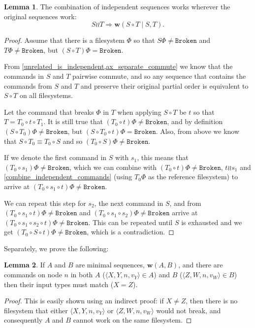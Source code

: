 \documentclass[12pt]{article}
\newcommand{\fsbroken}{\mathtt{Broken}} %
\newcommand{\FS}{\Phi} %
\newcommand{\valvy}{v_Y} %
\newcommand{\valvw}{v_W}
\newcommand{\caaaa}[4]{\langle{#1,#2,#3,#4}\rangle}
\newcommand{\cxynv}{\caaaa{X}{Y}{n}{\valvy}}
\newcommand{\czwnv}{\caaaa{Z}{W}{n}{\valvw}}
\newcommand{\cc}{\circ} %
\newcommand{\indep}{\mathrel{\wr\wr}} %
\newcommand{\workssign}{\mathbf{w}}
\newcommand{\works}[1]{\workssign({#1})}
\newcommand{\worksc}[2]{\workssign({#1}\mathrel{|}{#2})}
\theoremstyle{definition}
\newtheorem{mylem}{Lemma}
\begin{document}
\begin{mylem}\label{combine_independent_sequences}
The combination of independent sequences works wherever the original sequences work:
\[ S\indep T \Rightarrow \worksc{S\cc T}{S,T}. \]
\end{mylem}
\begin{proof}
Assume that there is a filesystem $\FS$ so that
$S\FS\neq\fsbroken$ and $T\FS\neq\fsbroken$, but
$(S\cc T)\FS=\fsbroken$.

From \cref{unrelated_is_independent,ax_separate_commute} we know that
the commands in $S$ and $T$ pairwise commute, and so any sequence
that contains the commands from $S$ and $T$ and preserve their original partial order
is equivalent to $S\cc T$ on all filesystems.

Let the command that breaks $\FS$ in $T$ when applying $S\cc T$ be $t$
so that $T=T_0\cc t\cc T_1$.
It is still true that $(T_0 \cc t)\FS\neq\fsbroken$,
and by definition $(S\cc T_0)\FS\neq\fsbroken$,
but $(S\cc T_0\cc t)\FS=\fsbroken$.
Also, from above we know that $S\cc T_0\equiv T_0\cc S$
and so $(T_0 \cc S)\FS\neq\fsbroken$.

If we denote the first command in $S$ with $s_1$,
this means that $(T_0 \cc s_1)\FS\neq\fsbroken$,
which we can combine with $(T_0 \cc t)\FS\neq\fsbroken$, $t\indep s_1$ and
\cref{combine_independent_commands}
(using $T_0\FS$ as the reference filesystem)
to arrive at $(T_0 \cc s_1\cc t)\FS\neq\fsbroken$.

We can repeat this step for $s_2$, the next command in $S$,
and from 
$(T_0 \cc s_1\cc t)\FS\neq\fsbroken$
and
$(T_0 \cc s_1\cc s_2)\FS\neq\fsbroken$
arrive at
$(T_0 \cc s_1\cc s_2\cc t)\FS\neq\fsbroken$.
This can be repeated until $S$ is exhausted and we get
$(T_0 \cc S\cc t)\FS\neq\fsbroken$, which is a contradiction.
\end{proof}

Separately, we prove the following:

\begin{mylem}\label{worksinputmatch}
If $A$ and $B$ are minimal sequences, $\works{A,B}$,
and there are commands on node $n$ in both $A$ ($\cxynv\in A$) and $B$ ($\czwnv\in B$)
then their input types must match ($X=Z$).
\end{mylem}
\begin{proof}
This is easily shown using an indirect proof: if $X\neq Z$, then there is no filesystem that
either $\cxynv$ or $\czwnv$ would not break, 
and consequently $A$ and $B$ cannot work on the same filesystem.
\end{proof}
\end{document}

